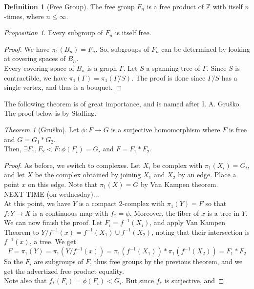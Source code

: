 \documentclass[11pt]{article}
\theoremstyle{definition}
\newtheorem{definition}{Definition}[section]
\theoremstyle{example}
\theoremstyle{remark}
\theoremstyle{lemma}
\theoremstyle{proposition}
\newtheorem{proposition}{Proposition}[section]
\theoremstyle{Problem}
\theoremstyle{Solution}
\theoremstyle{theorem}
\newtheorem{theorem}{Theorem}[section]
\begin{document}
\begin{definition}[Free Group]
The free group $F_n$ is a free product of $\mathbb{Z}$ with itself $n$-times, where $n\leq \infty$.
\end{definition}


\begin{proposition}
Every subgroup of $F_n$ is itself free.
\end{proposition}
\begin{proof}
We have $\pi_1(B_n) = F_n$. So, subgroups of $F_n$ can be determined by looking at covering spaces of $B_n$.\\
Every covering space of $B_n$ is a graph $\Gamma$. Let $S$ a spanning tree of $\Gamma$. Since $S$ is contractible, we have $\pi_1(\Gamma) = \pi_1(\Gamma/S)$. The proof is done since $\Gamma/S$ has a single vertex, and thus is a bouquet. 
\end{proof}

The following theorem is of great importance, and is named after I. A. Gru\v{s}ko. The proof below is by Stalling.
\begin{theorem}[Gru\v{s}ko]
Let $\phi: F \to G$ is a surjective homomorphism where $F$ is free and $G = G_1 * G_2$.\\
Then, $\exists F_1, F_2 < F : \phi(F_i) = G_i$ and $F = F_1 * F_2$.
\end{theorem}
\begin{proof}
As before, we switch to complexes. Let $X_i$ be complex with $\pi_1(X_i) = G_i$, and let $X$ be the complex obtained by joining $X_1$ and $X_2$ by an edge. Place a point $x$ on this edge. Note that $\pi_1(X) = G$ by Van Kampen theorem.\\
NEXT TIME (on wednesday)...\\
At this point, we have $Y$ is a compact $2$-complex with $\pi_1(Y) = F$ so that $f:Y\to X$ is a continuous map with $f_* = \phi$. Moreover, the fiber of $x$ is a tree in $Y$.\\
We can now finish the proof. Let $F_i = f^{-1}(X_i)$, and apply Van Kampen Theorem to $Y/f^{-1}(x) = f^{-1}(X_1) \cup f^{-1}(X_2)$, noting that their intersection is $f^{-1}(x)$, a tree. We get 
$$F = \pi_1(Y) = \pi_1(Y/f^{-1}(x)) = \pi_1(f^{-1}(X_1))*\pi_1(f^{-1}(X_2)) = F_1*F_2$$
So the $F_i$ are subgroups of $F$, thus free groups by the previous theorem, and we get the advertized free product equality. \\
Note also that $f_*(F_i) = \phi(F_i) < G_i$. But since $f_*$ is surjective, and 
\end{proof}
\end{document}
